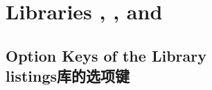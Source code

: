 \section{Libraries
  ,
  , and
  }\label{sec:listings}%
%

% 
% 
% 



\subsection{Option Keys of the  Library\\listings库的选项键}\label{sec:speclistingkeys}




